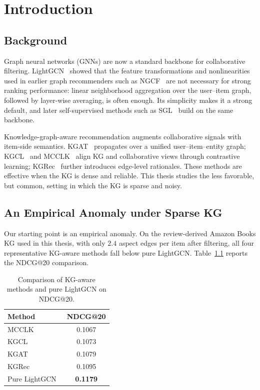 \chapter{Introduction}
\label{ch:intro}

\section{Background}
\label{sec:intro-background}

Graph neural networks (GNNs) are now a standard backbone for collaborative filtering. LightGCN~\cite{he2020lightgcn} showed that the feature transformations and nonlinearities used in earlier graph recommenders such as NGCF~\cite{wang2019ngcf} are not necessary for strong ranking performance: linear neighborhood aggregation over the user--item graph, followed by layer-wise averaging, is often enough. Its simplicity makes it a strong default, and later self-supervised methods such as SGL~\cite{wu2021sgl} build on the same backbone.

Knowledge-graph-aware recommendation augments collaborative signals with item-side semantics. KGAT~\cite{wang2019kgat} propagates over a unified user--item--entity graph; KGCL~\cite{yang2022kgcl} and MCCLK~\cite{zou2022mcclk} align KG and collaborative views through contrastive learning; KGRec~\cite{yang2023kgrec} further introduces edge-level rationales. These methods are effective when the KG is dense and reliable. This thesis studies the less favorable, but common, setting in which the KG is sparse and noisy.

\section{An Empirical Anomaly under Sparse KG}
\label{sec:intro-observation}

Our starting point is an empirical anomaly. On the review-derived Amazon Books KG used in this thesis, with only $2.4$ aspect edges per item after filtering, all four representative KG-aware methods fall below pure LightGCN. Table~\ref{tab:intro-baseline} reports the NDCG@20 comparison.

\begin{table}[H]
\centering
\caption{Comparison of KG-aware methods and pure LightGCN on NDCG@20.}
\label{tab:intro-baseline}
\begin{tabular}{lc}
\toprule
Method & NDCG@20 \\
\midrule
MCCLK~\cite{zou2022mcclk}      & 0.1067 \\
KGCL~\cite{yang2022kgcl}       & 0.1073 \\
KGAT~\cite{wang2019kgat}       & 0.1079 \\
KGRec~\cite{yang2023kgrec}     & 0.1095 \\
\midrule
Pure LightGCN~\cite{he2020lightgcn} & \textbf{0.1179} \\
\bottomrule
\end{tabular}
\end{table}
\FloatBarrier


